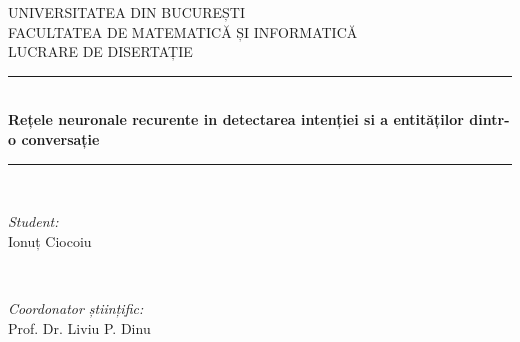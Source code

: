 \begin{titlepage}
	
	\newcommand{\HRule}{\rule{\linewidth}{0.5mm}} %
	
	\center %
	
	
	\textsc{\LARGE UNIVERSITATEA DIN BUCUREȘTI}\\[1.5cm] %
	\textsc{\Large FACULTATEA DE MATEMATICĂ ȘI INFORMATICĂ}\\[0.5cm] %
	\textsc{\large LUCRARE DE DISERTAȚIE}\\[0.5cm] %
	
	
	\HRule \\[0.4cm]
	{ \huge \bfseries Rețele neuronale recurente in detectarea intenției si a entităților dintr-o conversație}\\[0.4cm] %
	\HRule \\[1.5cm]
	
	
	\begin{minipage}{0.4\textwidth}
		\begin{flushleft} \large
			\emph{Student:}\\
			Ionuț Ciocoiu %
		\end{flushleft}
	\end{minipage}
	~
	\begin{minipage}{0.4\textwidth}
		\begin{flushright} \large
			\emph{Coordonator științific:} \\
			Prof. Dr. Liviu P. Dinu %
		\end{flushright}
	\end{minipage}\\[4cm]
	

\end{titlepage}
